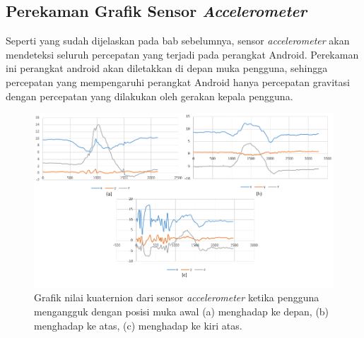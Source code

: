 \subsection{Perekaman Grafik Sensor \textit{Accelerometer}}
\label{sec:analisis_grafik_sensor_accelerometer}
Seperti yang sudah dijelaskan pada bab sebelumnya, sensor \textit{accelerometer} akan mendeteksi seluruh percepatan yang terjadi pada perangkat Android. Perekaman ini perangkat android akan diletakkan di depan muka pengguna, sehingga percepatan yang mempengaruhi perangkat Android hanya percepatan gravitasi dengan percepatan yang dilakukan oleh gerakan kepala pengguna. 

\begin{figure}[htbp]
\centering
\includegraphics[scale=0.6]{Gambar/grafik-sensor-accelerometer-mengangguk.png}
\caption{Grafik nilai kuaternion dari sensor \textit{accelerometer} ketika pengguna mengangguk dengan posisi muka awal (a) menghadap ke depan, (b) menghadap ke atas, (c) menghadap ke kiri atas.} 
\label{fig:grafik-sensor-accelerometer-mengangguk}
\end{figure}

